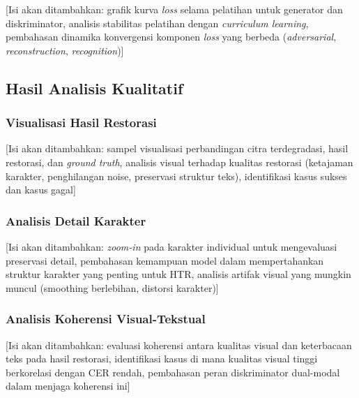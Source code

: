 \documentclass[12pt,a4paper]{article}
\begin{document}
[Isi akan ditambahkan: grafik kurva \textit{loss} selama pelatihan untuk generator dan diskriminator, analisis stabilitas pelatihan dengan \textit{curriculum learning}, pembahasan dinamika konvergensi komponen \textit{loss} yang berbeda (\textit{adversarial}, \textit{reconstruction}, \textit{recognition})]

\vspace{0.8em}

\subsection{Hasil Analisis Kualitatif}
\label{subsec:hasil-kualitatif}
\vspace{0.8em}

\subsubsection{Visualisasi Hasil Restorasi}
\label{subsubsec:visualisasi-hasil}

[Isi akan ditambahkan: sampel visualisasi perbandingan citra terdegradasi, hasil restorasi, dan \textit{ground truth}, analisis visual terhadap kualitas restorasi (ketajaman karakter, penghilangan noise, preservasi struktur teks), identifikasi kasus sukses dan kasus gagal]

\vspace{0.8em}

\subsubsection{Analisis Detail Karakter}
\label{subsubsec:analisis-karakter}

[Isi akan ditambahkan: \textit{zoom-in} pada karakter individual untuk mengevaluasi preservasi detail, pembahasan kemampuan model dalam mempertahankan struktur karakter yang penting untuk HTR, analisis artifak visual yang mungkin muncul (smoothing berlebihan, distorsi karakter)]

\vspace{0.8em}

\subsubsection{Analisis Koherensi Visual-Tekstual}
\label{subsubsec:koherensi-visual-tekstual}

[Isi akan ditambahkan: evaluasi koherensi antara kualitas visual dan keterbacaan teks pada hasil restorasi, identifikasi kasus di mana kualitas visual tinggi berkorelasi dengan CER rendah, pembahasan peran diskriminator dual-modal dalam menjaga koherensi ini]
\end{document}
